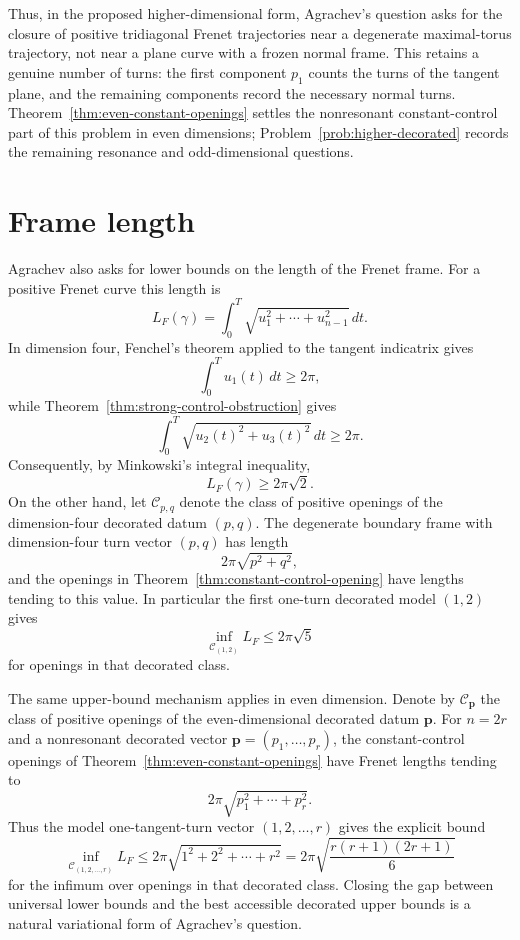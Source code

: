 \documentclass[11pt,reqno]{amsart}
\theoremstyle{definition}
\theoremstyle{remark}
\begin{document}
Thus, in the proposed higher-dimensional form, Agrachev's question asks for the
closure of positive tridiagonal Frenet trajectories near a degenerate maximal-torus
trajectory, not near a plane curve with a frozen normal frame.  This retains a genuine
number of turns: the first component $p_1$ counts the turns of the tangent plane, and
the remaining components record the necessary normal turns.  Theorem~\ref{thm:even-constant-openings}
settles the nonresonant constant-control part of this problem in even dimensions;
Problem~\ref{prob:higher-decorated} records the remaining resonance and odd-dimensional
questions.

\section{Frame length}

Agrachev also asks for lower bounds on the length of the Frenet frame.  For a
positive Frenet curve this length is
\[
        L_F(\gamma)=\int_0^T\sqrt{u_1^2+\cdots+u_{n-1}^2}\,dt .
\]
In dimension four, Fenchel's theorem applied to the tangent indicatrix gives
\[
        \int_0^T u_1(t)\,dt\ge2\pi,
\]
while Theorem~\ref{thm:strong-control-obstruction} gives
\[
        \int_0^T\sqrt{u_2(t)^2+u_3(t)^2}\,dt\ge2\pi .
\]
Consequently, by Minkowski's integral inequality,
\begin{equation}\label{eq:universal-length-bound}
        L_F(\gamma)\ge2\pi\sqrt2 .
\end{equation}
On the other hand, let $\mathcal C_{p,q}$ denote the class of positive openings of the dimension-four decorated datum $(p,q)$.  The degenerate boundary frame with dimension-four turn vector
$(p,q)$ has length
\[
        2\pi\sqrt{p^2+q^2},
\]
and the openings in Theorem~\ref{thm:constant-control-opening} have lengths tending
to this value.  In particular the first one-turn decorated model $(1,2)$ gives
\[
        \inf_{\mathcal C_{(1,2)}} L_F\le2\pi\sqrt5
\]
for openings in that decorated class.

The same upper-bound mechanism applies in even dimension.  Denote by $\mathcal C_{\mathbf p}$ the class of positive openings of the even-dimensional decorated datum $\mathbf p$.  For $n=2r$ and a
nonresonant decorated vector $\mathbf p=(p_1,\ldots,p_r)$, the constant-control
openings of Theorem~\ref{thm:even-constant-openings} have Frenet lengths tending to
\[
        2\pi\sqrt{p_1^2+\cdots+p_r^2}.
\]
Thus the model one-tangent-turn vector $(1,2,\ldots,r)$ gives the explicit bound
\[
        \inf_{\mathcal C_{(1,2,\ldots,r)}} L_F\le 2\pi\sqrt{1^2+2^2+\cdots+r^2}
        =2\pi\sqrt{\frac{r(r+1)(2r+1)}6}
\]
for the infimum over openings in that decorated class.  Closing the gap between universal lower bounds and the
best accessible decorated upper bounds is a natural variational form of Agrachev's
question.
\end{document}
